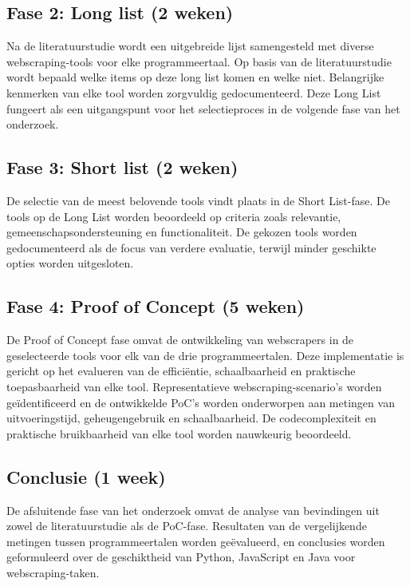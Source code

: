\subsection{Fase 2: Long list (2 weken)}
Na de literatuurstudie wordt een uitgebreide lijst samengesteld met diverse webscraping-tools voor elke programmeertaal. 
Op basis van de literatuurstudie wordt bepaald welke items op deze long list komen en welke niet. Belangrijke kenmerken van elke tool 
worden zorgvuldig gedocumenteerd. Deze Long List fungeert als een uitgangspunt voor het selectieproces in de volgende fase 
van het onderzoek.

\subsection{Fase 3: Short list (2 weken)}
De selectie van de meest belovende tools vindt plaats in de Short List-fase. De tools op de Long List worden beoordeeld op 
criteria zoals relevantie, gemeenschapsondersteuning en functionaliteit. 
De gekozen tools worden gedocumenteerd als de focus van verdere evaluatie, terwijl minder geschikte opties 
worden uitgesloten.

\subsection{Fase 4: Proof of Concept (5 weken)}
De Proof of Concept fase omvat de ontwikkeling van webscrapers in de geselecteerde tools voor elk van de drie programmeertalen. 
Deze implementatie is gericht op het evalueren van de efficiëntie, schaalbaarheid en praktische toepasbaarheid van elke tool. 
Representatieve webscraping-scenario's worden geïdentificeerd en de ontwikkelde PoC's worden onderworpen aan metingen van 
uitvoeringstijd, geheugengebruik en schaalbaarheid. De codecomplexiteit en praktische bruikbaarheid van elke tool worden 
nauwkeurig beoordeeld.

\subsection{Conclusie (1 week)}
De afsluitende fase van het onderzoek omvat de analyse van bevindingen uit zowel de literatuurstudie als de PoC-fase. 
Resultaten van de vergelijkende metingen tussen programmeertalen worden geëvalueerd, en conclusies worden geformuleerd over de 
geschiktheid van Python, JavaScript en Java voor webscraping-taken.
